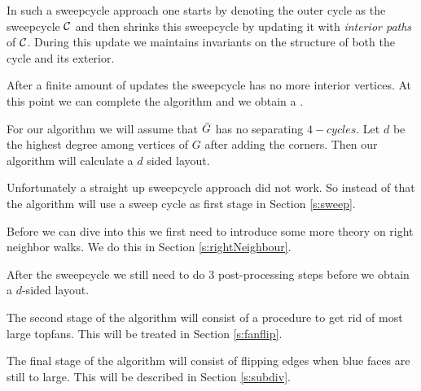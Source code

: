  In such a sweepcycle approach one starts by denoting the outer cycle as the sweepcycle $\mathcal{C}$ and then shrinks this sweepcycle by updating it with \emph{interior paths} of $\mathcal{C}$. During this update we maintains invariants on the structure of both the cycle and its exterior.

  After a finite amount of updates the sweepcycle has no more interior vertices. At this point we can complete the algorithm and we obtain a \rel.

  For our algorithm we will assume that $\bar{G}$ has no separating $4-cycles$. Let $d$ be the highest degree among vertices of $G$ after adding the corners. Then our algorithm will calculate a $d$ sided layout.

  Unfortunately a straight up sweepcycle approach did not work. So instead of that the algorithm will use a sweep cycle as first stage in Section \ref{s:sweep}.

  Before we can dive into this we first need to introduce some more theory on right neighbor walks. We do this in Section \ref{s:rightNeighbour}.

  After the sweepcycle we still need to do $3$ post-processing steps before we obtain a $d$-sided layout.

  The second stage of the algorithm will consist of a procedure to get rid of most large topfans. This will be treated in Section \ref{s:fanflip}.

  The final stage of the algorithm will consist of flipping edges when blue faces are still to large. This will be described in Section \ref{s:subdiv}.
